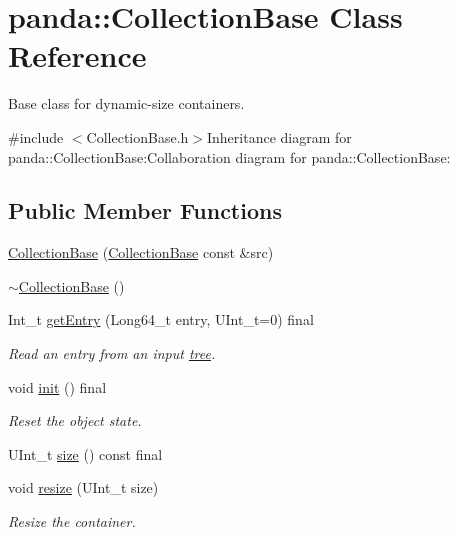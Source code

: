\hypertarget{classpanda_1_1CollectionBase}{
\section{panda::CollectionBase Class Reference}
\label{classpanda_1_1CollectionBase}
}


Base class for dynamic-\/size containers.  


{\ttfamily \#include $<$CollectionBase.h$>$}Inheritance diagram for panda::CollectionBase:Collaboration diagram for panda::CollectionBase:\subsection*{Public Member Functions}
\begin{DoxyCompactItemize}
\item 
\hyperlink{classpanda_1_1CollectionBase_a6e30b7cb32f9e4c46c4ce96bb0ccff2e}{CollectionBase} (\hyperlink{classpanda_1_1CollectionBase}{CollectionBase} const \&src)
\item 
\hyperlink{classpanda_1_1CollectionBase_a56858ddc5cafa8233daec30c0ad2769a}{$\sim$CollectionBase} ()
\item 
Int\_\-t \hyperlink{classpanda_1_1CollectionBase_a777e26ce2cc4f86e7cc4eb345b0a78d7}{getEntry} (Long64\_\-t entry, UInt\_\-t=0) final
\begin{DoxyCompactList}\small\item\em Read an entry from an input \hyperlink{namespacepanda_1_1tree}{tree}. \item\end{DoxyCompactList}\item 
void \hyperlink{classpanda_1_1CollectionBase_acf4c92c41e6efccc8833981c8e8725c1}{init} () final
\begin{DoxyCompactList}\small\item\em Reset the object state. \item\end{DoxyCompactList}\item 
UInt\_\-t \hyperlink{classpanda_1_1CollectionBase_a341cdaab81b20671510b14476973369e}{size} () const final
\item 
void \hyperlink{classpanda_1_1CollectionBase_a3ec014ac2da87bb755afbea0822621cc}{resize} (UInt\_\-t size)
\begin{DoxyCompactList}\small\item\em Resize the container. \item\end{DoxyCompactList}\item 

\end{DoxyCompactItemize}
